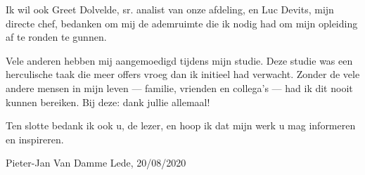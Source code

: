 Ik wil ook Greet Dolvelde, sr. analist van onze afdeling, en Luc Devits, mijn directe chef, bedanken om mij de ademruimte die ik nodig had om mijn opleiding af te ronden te gunnen.

Vele anderen  hebben mij aangemoedigd tijdens mijn studie. Deze studie was een herculische taak die meer offers vroeg dan ik initieel had verwacht. Zonder de vele andere mensen in mijn leven — familie, vrienden en collega's — had ik dit nooit kunnen bereiken. Bij deze: dank jullie allemaal!

Ten slotte bedank ik ook u, de lezer, en hoop ik dat mijn werk u mag informeren en inspireren.

\begin{flushright}
Pieter-Jan Van Damme\linebreak
Lede, 20/08/2020
\end{flushright}